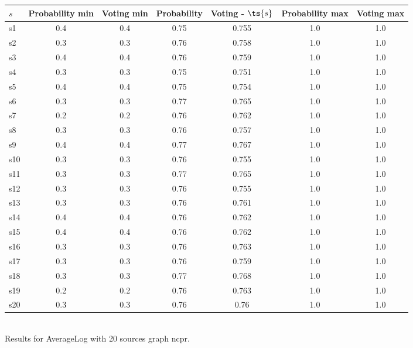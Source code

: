 \documentclass{article}
\begin{document}
\noindent\begin{tabular}{|l|c|c|c|c|c|c|}
\hline
$s$& Probability min & Voting min & Probability & Voting - $\ts{s}$ & Probability max & Voting max\\
\hline
s1 &0.4 & 0.4 & 0.75 & 0.755 & 1.0 & 1.0\\
\hline
s2 &0.3 & 0.3 & 0.76 & 0.758 & 1.0 & 1.0\\
\hline
s3 &0.4 & 0.4 & 0.76 & 0.759 & 1.0 & 1.0\\
\hline
s4 &0.3 & 0.3 & 0.75 & 0.751 & 1.0 & 1.0\\
\hline
s5 &0.4 & 0.4 & 0.75 & 0.754 & 1.0 & 1.0\\
\hline
s6 &0.3 & 0.3 & 0.77 & 0.765 & 1.0 & 1.0\\
\hline
s7 &0.2 & 0.2 & 0.76 & 0.762 & 1.0 & 1.0\\
\hline
s8 &0.3 & 0.3 & 0.76 & 0.757 & 1.0 & 1.0\\
\hline
s9 &0.4 & 0.4 & 0.77 & 0.767 & 1.0 & 1.0\\
\hline
s10 &0.3 & 0.3 & 0.76 & 0.755 & 1.0 & 1.0\\
\hline
s11 &0.3 & 0.3 & 0.77 & 0.765 & 1.0 & 1.0\\
\hline
s12 &0.3 & 0.3 & 0.76 & 0.755 & 1.0 & 1.0\\
\hline
s13 &0.3 & 0.3 & 0.76 & 0.761 & 1.0 & 1.0\\
\hline
s14 &0.4 & 0.4 & 0.76 & 0.762 & 1.0 & 1.0\\
\hline
s15 &0.4 & 0.4 & 0.76 & 0.762 & 1.0 & 1.0\\
\hline
s16 &0.3 & 0.3 & 0.76 & 0.763 & 1.0 & 1.0\\
\hline
s17 &0.3 & 0.3 & 0.76 & 0.759 & 1.0 & 1.0\\
\hline
s18 &0.3 & 0.3 & 0.77 & 0.768 & 1.0 & 1.0\\
\hline
s19 &0.2 & 0.2 & 0.76 & 0.763 & 1.0 & 1.0\\
\hline
s20 &0.3 & 0.3 & 0.76 & 0.76 & 1.0 & 1.0\\
\hline
\end{tabular}\\

\noindent Results for AverageLog with 20 sources graph ncpr.
\end{document}
